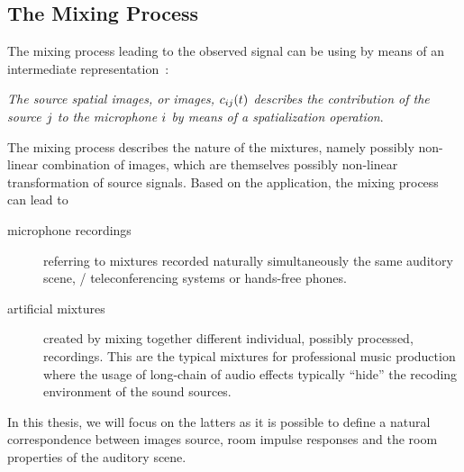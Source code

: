 \subsection{The Mixing Process}
The mixing process leading to the observed signal can be using by means of an intermediate representation~\cite{sturmel2012linear}:
\begin{center}
    \textit{The \emph{source spatial images}, or \emph{images},  $c_{ij}(t)$ describes the contribution
    of the source $j$ to the microphone $i$ by means of a spatialization
    operation}.
\end{center}

The mixing process describes the nature of the mixtures, namely possibly non-linear combination of images, which are themselves possibly non-linear transformation of source signals.
Based on the application, the mixing process can lead to
\begin{description}
    \item[microphone recordings] referring to mixtures recorded naturally simultaneously the same auditory scene, \ie/ teleconferencing systems or hands-free phones.
    \item[artificial mixtures] created by mixing together different individual, possibly processed, recordings.
    This are the typical mixtures for professional music production where the usage of long-chain of audio effects typically ``hide'' the recoding environment of the sound sources.
\end{description}
In this thesis, we will focus on the latters as it is possible to define a natural correspondence between images source, room impulse responses and the
room properties of the auditory scene.


